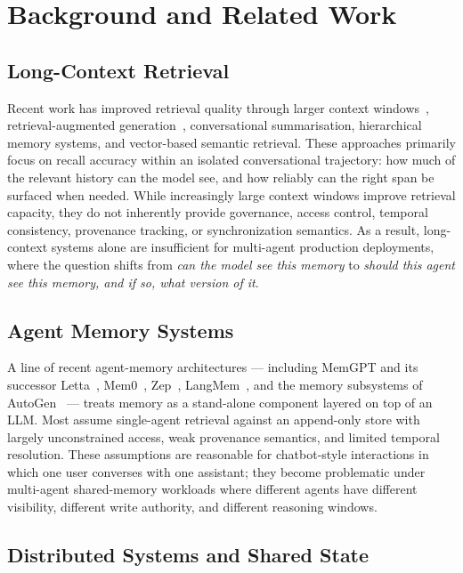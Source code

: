 \documentclass[10pt,twocolumn,letterpaper]{article}
\begin{document}
\section{Background and Related Work}

\subsection{Long-Context Retrieval}

Recent work has improved retrieval quality through larger context windows~\citep{longcontext_survey}, retrieval-augmented generation~\citep{rag2020}, conversational summarisation, hierarchical memory systems, and vector-based semantic retrieval. These approaches primarily focus on recall accuracy within an isolated conversational trajectory: how much of the relevant history can the model see, and how reliably can the right span be surfaced when needed. While increasingly large context windows improve retrieval capacity, they do not inherently provide governance, access control, temporal consistency, provenance tracking, or synchronization semantics. As a result, long-context systems alone are insufficient for multi-agent production deployments, where the question shifts from \emph{can the model see this memory} to \emph{should this agent see this memory, and if so, what version of it}.

\subsection{Agent Memory Systems}

A line of recent agent-memory architectures --- including MemGPT and its successor Letta~\citep{memgpt2023}, Mem0~\citep{mem0}, Zep~\citep{zep}, LangMem~\citep{langmem}, and the memory subsystems of AutoGen~\citep{autogen} --- treats memory as a stand-alone component layered on top of an LLM. Most assume single-agent retrieval against an append-only store with largely unconstrained access, weak provenance semantics, and limited temporal resolution. These assumptions are reasonable for chatbot-style interactions in which one user converses with one assistant; they become problematic under multi-agent shared-memory workloads where different agents have different visibility, different write authority, and different reasoning windows.

\subsection{Distributed Systems and Shared State}
\end{document}
